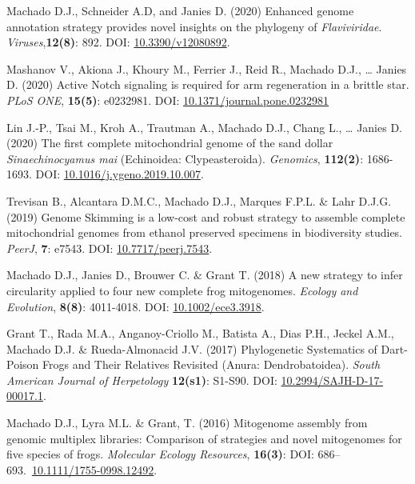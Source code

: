 {\begin{hangparas}{.25in}{1}
        Machado D.J., Schneider A.D, and Janies D. (2020) Enhanced genome annotation strategy provides novel insights on the phylogeny of \emph{Flaviviridae}. \emph{Viruses},\textbf{12(8)}: 892. DOI: \href{https://www.mdpi.com/1999-4915/12/8/892}{10.3390/v12080892}.

	    Mashanov V., Akiona J., Khoury M., Ferrier J., Reid R., Machado D.J., … Janies D. (2020) Active Notch signaling is required for arm regeneration in a brittle star. \emph{PLoS ONE}, \textbf{15(5)}: e0232981. DOI: \href{https://doi.org/10.1371/journal.pone.0232981}{10.1371/journal.pone.0232981}

	    Lin J.-P., Tsai M., Kroh A., Trautman A., Machado D.J., Chang L., … Janies D. (2020) The first complete mitochondrial genome of the sand dollar \emph{Sinaechinocyamus mai} (Echinoidea: Clypeasteroida). \emph{Genomics}, \textbf{112(2)}: 1686-1693. DOI: \href{https://doi.org/10.1016/j.ygeno.2019.10.007}{10.1016/j.ygeno.2019.10.007}.


		Trevisan B., Alcantara D.M.C., Machado D.J., Marques F.P.L. \& Lahr D.J.G. (2019) Genome Skimming is a low-cost and robust strategy to assemble complete mitochondrial genomes from ethanol preserved specimens in biodiversity studies. \emph{PeerJ}, \textbf{7}: e7543. DOI: \href{https://doi.org/10.7717/peerj.7543}{10.7717/peerj.7543}.


		Machado D.J., Janies D., Brouwer C. \& Grant T. (2018) A new strategy to infer circularity applied to four new complete frog mitogenomes. \emph{Ecology and Evolution}, \textbf{8(8)}: 4011-4018. DOI: \href{http://doi.wiley.com/10.1002/ece3.3918}{10.1002/ece3.3918}.


		Grant T., Rada M.A., Anganoy-Criollo M., Batista A., Dias P.H., Jeckel A.M., Machado D.J. \& Rueda-Almonacid J.V. (2017) Phylogenetic Systematics of Dart-Poison Frogs and Their Relatives Revisited (Anura: Dendrobatoidea). \emph{South American Journal of Herpetology} \textbf{12(s1)}: S1-S90. DOI: \href{http://www.bioone.org/doi/10.2994/SAJH-D-17-00017.1}{10.2994/SAJH-D-17-00017.1}.


		Machado D.J., Lyra M.L. \& Grant, T. (2016) Mitogenome assembly from genomic multiplex libraries: Comparison of strategies and novel mitogenomes for five species of frogs. \emph{Molecular Ecology Resources}, \textbf{16(3)}: DOI: 686--693.~\href{https://doi.org/10.1111/1755-0998.12492}{10.1111/1755-0998.12492}.


\end{hangparas}}
